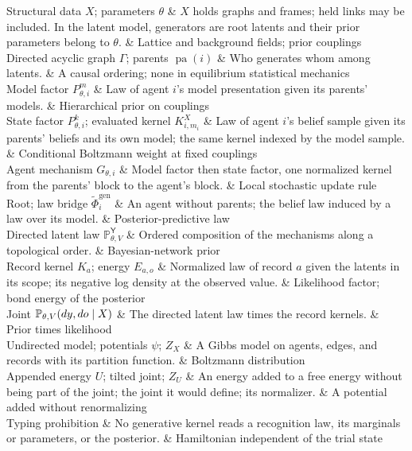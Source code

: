 \begin{decoder}
Structural data $X$; parameters $\theta$ & $X$ holds graphs and frames; held links may be included. In the latent model, generators are root latents and their prior parameters belong to $\theta$. & Lattice and background fields; prior couplings \\
Directed acyclic graph $\Gamma$; parents $\operatorname{pa}(i)$ & Who generates whom among latents. & A causal ordering; none in equilibrium statistical mechanics \\
Model factor $P^m_{\theta,i}$ & Law of agent $i$'s model presentation given its parents' models. & Hierarchical prior on couplings \\
State factor $P^k_{\theta,i}$; evaluated kernel $K^X_{i,m_i}$ & Law of agent $i$'s belief sample given its parents' beliefs and its own model; the same kernel indexed by the model sample. & Conditional Boltzmann weight at fixed couplings \\
Agent mechanism $G_{\theta,i}$ & Model factor then state factor, one normalized kernel from the parents' block to the agent's block. & Local stochastic update rule \\
Root; law bridge $\widetilde\Phi^{\mathrm{gen}}_i$ & An agent without parents; the belief law induced by a law over its model. & Posterior-predictive law \\
Directed latent law $\mathbb P^{\mathsf Y}_{\theta,V}$ & Ordered composition of the mechanisms along a topological order. & Bayesian-network prior \\
Record kernel $K_a$; energy $E_{a,o}$ & Normalized law of record $a$ given the latents in its scope; its negative log density at the observed value. & Likelihood factor; bond energy of the posterior \\
Joint $\mathbb P_{\theta,V}(dy,do\mid X)$ & The directed latent law times the record kernels. & Prior times likelihood \\
Undirected model; potentials $\psi$; $Z_X$ & A Gibbs model on agents, edges, and records with its partition function. & Boltzmann distribution \\
Appended energy $U$; tilted joint; $Z_U$ & An energy added to a free energy without being part of the joint; the joint it would define; its normalizer. & A potential added without renormalizing \\
Typing prohibition & No generative kernel reads a recognition law, its marginals or parameters, or the posterior. & Hamiltonian independent of the trial state \\

\end{decoder}
